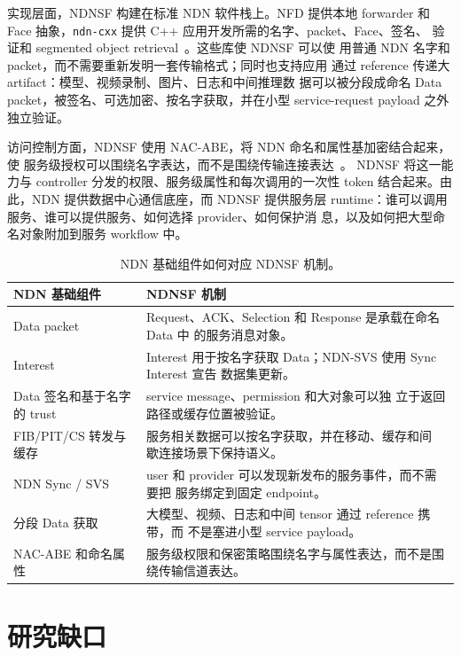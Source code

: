 实现层面，NDNSF 构建在标准 NDN 软件栈上。NFD 提供本地 forwarder 和 Face
抽象，\texttt{ndn-cxx} 提供 C++ 应用开发所需的名字、packet、Face、签名、
验证和 segmented object retrieval~\cite{ndn-cxx}。这些库使 NDNSF 可以使
用普通 NDN 名字和 packet，而不需要重新发明一套传输格式；同时也支持应用
通过 reference 传递大 artifact：模型、视频录制、图片、日志和中间推理数
据可以被分段成命名 Data packet，被签名、可选加密、按名字获取，并在小型
service-request payload 之外独立验证。

访问控制方面，NDNSF 使用 NAC-ABE，将 NDN 命名和属性基加密结合起来，使
服务级授权可以围绕名字表达，而不是围绕传输连接表达~\cite{dulal2023nacabe}。
NDNSF 将这一能力与 controller 分发的权限、服务级属性和每次调用的一次性
token 结合起来。由此，NDN 提供数据中心通信底座，而 NDNSF 提供服务层
runtime：谁可以调用服务、谁可以提供服务、如何选择 provider、如何保护消
息，以及如何把大型命名对象附加到服务 workflow 中。

\begin{table}[H]
\centering
\caption{NDN 基础组件如何对应 NDNSF 机制。}
\label{tab:ndn-to-ndnsf-ch}
\begin{tabularx}{\textwidth}{p{}X}
\toprule
NDN 基础组件 & NDNSF 机制 \\
\midrule
Data packet & Request、ACK、Selection 和 Response 是承载在命名 Data 中
的服务消息对象。 \\
Interest & Interest 用于按名字获取 Data；NDN-SVS 使用 Sync Interest 宣告
数据集更新。 \\
Data 签名和基于名字的 trust & service message、permission 和大对象可以独
立于返回路径或缓存位置被验证。 \\
FIB/PIT/CS 转发与缓存 & 服务相关数据可以按名字获取，并在移动、缓存和间
歇连接场景下保持语义。 \\
NDN Sync / SVS & user 和 provider 可以发现新发布的服务事件，而不需要把
服务绑定到固定 endpoint。 \\
分段 Data 获取 & 大模型、视频、日志和中间 tensor 通过 reference 携带，而
不是塞进小型 service payload。 \\
NAC-ABE 和命名属性 & 服务级权限和保密策略围绕名字与属性表达，而不是围
绕传输信道表达。 \\
\bottomrule
\end{tabularx}
\end{table}

\section{研究缺口}

